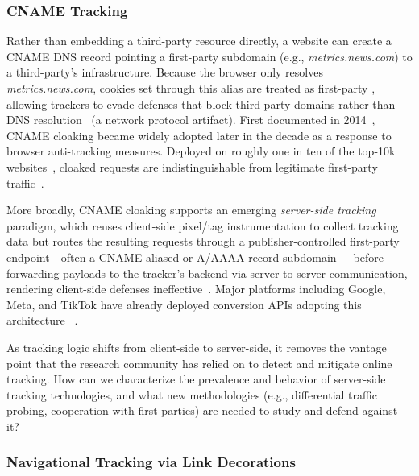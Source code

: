 \subsubsection{CNAME Tracking}
\label{sec:stateful-techniques-cname}
Rather than embedding a third-party resource directly, a website can create a CNAME DNS record pointing a first-party subdomain (e.g., \textit{metrics.news.com}) to a third-party's infrastructure.
%
Because the browser only resolves \textit{metrics.news.com}, cookies set through this alias are treated as first-party \symStorage, allowing trackers to evade defenses that block third-party domains rather than DNS resolution~\cite{dimovaCNAMEGameLargescale2021} (a network protocol artifact). 
%
First documented in 2014~\cite{olejnikSellingPrivacyAuction2014,olejnikBidNotBid2014}, CNAME cloaking became widely adopted later in the decade as a response to browser anti-tracking measures. Deployed on roughly one in ten of the top-10k websites~\cite{dimovaCNAMEGameLargescale2021}, cloaked requests are indistinguishable from legitimate first-party traffic~\cite{dimovaCNAMEGameLargescale2021,chenCookieSwapParty2021}.


More broadly, CNAME cloaking supports an emerging \emph{server-side tracking} paradigm, which reuses client-side pixel/tag instrumentation to collect tracking data but routes the resulting requests through a publisher-controlled first-party endpoint---often a CNAME-aliased or A/AAAA-record subdomain~\cite{jazlanSSTGuardDetectingCharacterizing2026}---before forwarding payloads to the tracker's backend via server-to-server communication, rendering client-side defenses ineffective~\cite{fouadDevilDetailsDetection2024}.
%
Major platforms including Google, Meta, and TikTok have already deployed conversion APIs adopting this architecture
~\cite{fraihiClientsideServersideTracking2024}.

\begin{opbox}
As tracking logic shifts from client-side to server-side, it removes the vantage point that the research community has relied on to detect and mitigate online tracking. How can we characterize the prevalence and behavior of server-side tracking technologies, and what new methodologies (e.g., differential traffic probing, cooperation with first parties) are needed to study and defend against it?
\end{opbox}



\subsubsection{Navigational Tracking via Link Decorations}
\label{sec:stateful-techniques-link-decorations}

